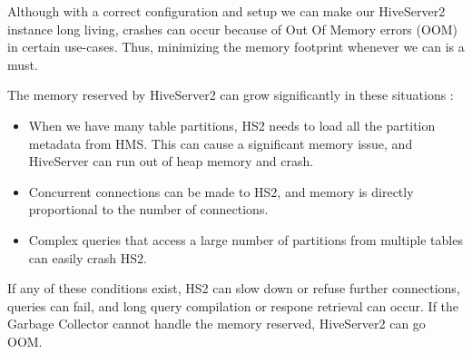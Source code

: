 Although with a correct configuration and setup we can make our HiveServer2 instance long living, crashes can occur because of Out Of Memory errors (OOM) in certain use-cases. Thus, minimizing the memory footprint whenever we can is a must.

\noindent The memory reserved by HiveServer2 can grow significantly in these situations  \cite{Hive-memory-problems}: 
\begin{itemize}
	\item When we have many table partitions, HS2 needs to load all the partition metadata from HMS. This can cause a significant memory issue, and HiveServer can run out of heap memory and crash.
	\item Concurrent connections can be made to HS2, and memory is directly proportional to the number of connections. 
	\item Complex queries that access a large number of partitions from multiple tables can easily crash HS2.
\end{itemize}

If any of these conditions exist, HS2 can slow down or refuse further connections, queries can fail, and long query compilation or respone retrieval can occur. If the Garbage Collector cannot handle the memory reserved, HiveServer2 can go OOM.
